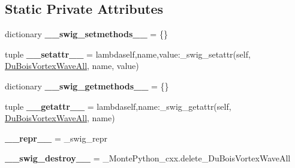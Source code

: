 \subsection*{Static Private Attributes}
\begin{DoxyCompactItemize}
\item 
\hypertarget{classMontePython__cxx_1_1DuBoisVortexWaveAll_af04471dea49f306acd3f38d4c4d5ae02}{}dictionary {\bfseries \+\_\+\+\_\+swig\+\_\+setmethods\+\_\+\+\_\+} = \{\}\label{classMontePython__cxx_1_1DuBoisVortexWaveAll_af04471dea49f306acd3f38d4c4d5ae02}

\item 
\hypertarget{classMontePython__cxx_1_1DuBoisVortexWaveAll_a51285ffa33b4fb32feb7a15bedd494cd}{}tuple {\bfseries \+\_\+\+\_\+setattr\+\_\+\+\_\+} = lambdaself,name,value\+:\+\_\+swig\+\_\+setattr(self, \hyperlink{classMontePython__cxx_1_1DuBoisVortexWaveAll}{Du\+Bois\+Vortex\+Wave\+All}, name, value)\label{classMontePython__cxx_1_1DuBoisVortexWaveAll_a51285ffa33b4fb32feb7a15bedd494cd}

\item 
\hypertarget{classMontePython__cxx_1_1DuBoisVortexWaveAll_afa76b6de96821f3f686fab70a47d9c22}{}dictionary {\bfseries \+\_\+\+\_\+swig\+\_\+getmethods\+\_\+\+\_\+} = \{\}\label{classMontePython__cxx_1_1DuBoisVortexWaveAll_afa76b6de96821f3f686fab70a47d9c22}

\item 
\hypertarget{classMontePython__cxx_1_1DuBoisVortexWaveAll_ad0f556f0cae614bfe6b9caa122b79c71}{}tuple {\bfseries \+\_\+\+\_\+getattr\+\_\+\+\_\+} = lambdaself,name\+:\+\_\+swig\+\_\+getattr(self, \hyperlink{classMontePython__cxx_1_1DuBoisVortexWaveAll}{Du\+Bois\+Vortex\+Wave\+All}, name)\label{classMontePython__cxx_1_1DuBoisVortexWaveAll_ad0f556f0cae614bfe6b9caa122b79c71}

\item 
\hypertarget{classMontePython__cxx_1_1DuBoisVortexWaveAll_a833adb016f67537b52f39ee195822f8f}{}{\bfseries \+\_\+\+\_\+repr\+\_\+\+\_\+} = \+\_\+swig\+\_\+repr\label{classMontePython__cxx_1_1DuBoisVortexWaveAll_a833adb016f67537b52f39ee195822f8f}

\item 
\hypertarget{classMontePython__cxx_1_1DuBoisVortexWaveAll_aa03a783e741530cc7c0a08e3cb7f95a7}{}{\bfseries \+\_\+\+\_\+swig\+\_\+destroy\+\_\+\+\_\+} = \+\_\+\+Monte\+Python\+\_\+cxx.\+delete\+\_\+\+Du\+Bois\+Vortex\+Wave\+All\label{classMontePython__cxx_1_1DuBoisVortexWaveAll_aa03a783e741530cc7c0a08e3cb7f95a7}

\end{DoxyCompactItemize}


